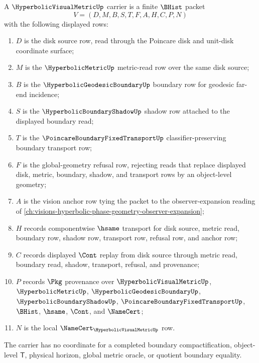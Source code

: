 \begin{definition}
\label{def:hyperbolic-visual-metric-carrier}
A $\HyperbolicVisualMetricUp$ carrier is a finite $\BHist$ packet
$$
V=(D,M,B,S,T,F,A,H,C,P,N)
$$
with the following displayed rows:
\begin{enumerate}
\item $D$ is the disk source row, read through the Poincare disk and unit-disk coordinate surface;
\item $M$ is the $\HyperbolicMetricUp$ metric-read row over the same disk source;
\item $B$ is the $\HyperbolicGeodesicBoundaryUp$ boundary row for geodesic far-end incidence;
\item $S$ is the $\HyperbolicBoundaryShadowUp$ shadow row attached to the displayed boundary read;
\item $T$ is the $\PoincareBoundaryFixedTransportUp$ classifier-preserving boundary transport row;
\item $F$ is the global-geometry refusal row, rejecting reads that replace displayed disk, metric, boundary, shadow, and transport rows by an object-level geometry;
\item $A$ is the vision anchor row tying the packet to the observer-expansion reading of \autoref{ch:visions-hyperbolic-phase-geometry-observer-expansion};
\item $H$ records componentwise $\hsame$ transport for disk source, metric read, boundary row, shadow row, transport row, refusal row, and anchor row;
\item $C$ records displayed $\Cont$ replay from disk source through metric read, boundary read, shadow, transport, refusal, and provenance;
\item $P$ records $\Pkg$ provenance over $\HyperbolicVisualMetricUp$, $\HyperbolicMetricUp$, $\HyperbolicGeodesicBoundaryUp$, $\HyperbolicBoundaryShadowUp$, $\PoincareBoundaryFixedTransportUp$, $\BHist$, $\hsame$, $\Cont$, and $\NameCert$;
\item $N$ is the local $\NameCert_{\HyperbolicVisualMetricUp}$ row.
\end{enumerate}
The carrier has no coordinate for a completed boundary compactification, object-level $\mathsf{T}$, physical horizon, global metric oracle, or quotient boundary equality.
\end{definition}

